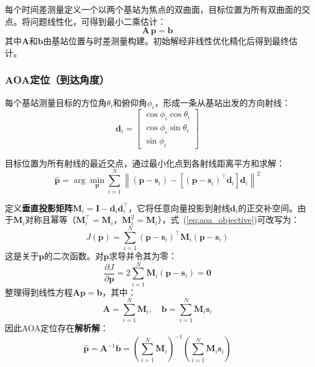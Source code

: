 \documentclass[12pt, a4paper]{article}
\begin{document}
每个时间差测量定义一个以两个基站为焦点的双曲面，目标位置为所有双曲面的交点。将问题线性化，可得到最小二乘估计：
\begin{equation}
  \bm{A}\,\bm{p} = \bm{b}
  \label{eq:tdoa_linear}
\end{equation}
其中$\bm{A}$和$\bm{b}$由基站位置与时差测量构建。初始解经非线性优化精化后得到最终估计\cite{ref_tdoa}。

\subsubsection{AOA定位（到达角度）}

每个基站测量目标的方位角$\theta_i$和俯仰角$\phi_i$，形成一条从基站出发的方向射线：
\begin{equation}
  \bm{d}_i = \begin{bmatrix}
    \cos\phi_i\cos\theta_i \\
    \cos\phi_i\sin\theta_i \\
    \sin\phi_i
  \end{bmatrix}
  \label{eq:aoa_direction}
\end{equation}

目标位置为所有射线的最近交点，通过最小化点到各射线距离平方和求解：
\begin{equation}
  \hat{\bm{p}} = \arg\min_{\bm{p}} \sum_{i=1}^{N}
  \left\|\left(\bm{p}-\bm{s}_i\right) - \left[\left(\bm{p}-\bm{s}_i\right)^\top\bm{d}_i\right]\bm{d}_i\right\|^2
  \label{eq:aoa_objective}
\end{equation}

定义\textbf{垂直投影矩阵}$\bm{M}_i = \bm{I} - \bm{d}_i\bm{d}_i^\top$，它将任意向量投影到射线$\bm{d}_i$的正交补空间。由于$\bm{M}_i$对称且幂等（$\bm{M}_i^\top = \bm{M}_i$，$\bm{M}_i^2 = \bm{M}_i$），式~(\ref{eq:aoa_objective})可改写为：
\begin{equation}
  J(\bm{p}) = \sum_{i=1}^{N} (\bm{p} - \bm{s}_i)^\top \bm{M}_i (\bm{p} - \bm{s}_i)
  \label{eq:aoa_quadratic}
\end{equation}
这是关于$\bm{p}$的二次函数。对$\bm{p}$求导并令其为零：
\[
  \frac{\partial J}{\partial \bm{p}} = 2\sum_{i=1}^{N} \bm{M}_i(\bm{p} - \bm{s}_i) = \bm{0}
\]
整理得到线性方程$\bm{A}\bm{p} = \bm{b}$，其中：
\begin{equation}
  \bm{A} = \sum_{i=1}^{N}\bm{M}_i, \quad \bm{b} = \sum_{i=1}^{N}\bm{M}_i\bm{s}_i
  \label{eq:aoa_Ab}
\end{equation}
因此AOA定位存在\textbf{解析解}：
\begin{equation}
  \boxed{\hat{\bm{p}} = \bm{A}^{-1}\bm{b} = \left(\sum_{i=1}^{N}\bm{M}_i\right)^{-1}\left(\sum_{i=1}^{N}\bm{M}_i\bm{s}_i\right)}
  \label{eq:aoa_closed_form}
\end{equation}
\end{document}
